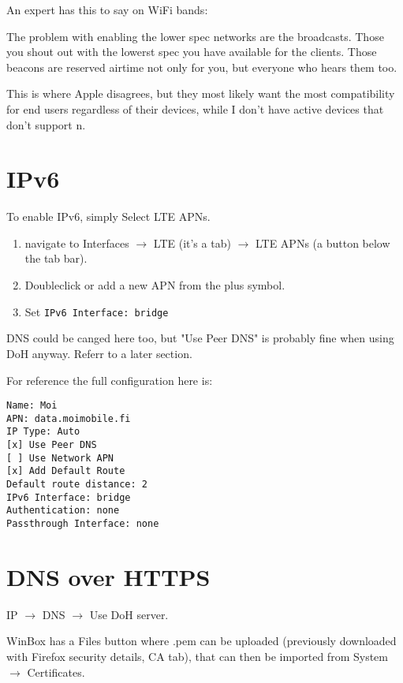 \documentclass[a4paper,colorlinks,linkcolor=blue]{rapport3}
\begin{document}
%
An expert has this to say on WiFi bands:

\begin{displayquote}
The problem with enabling the lower spec networks are the broadcasts. Those you shout out with the lowerst spec you have available for the clients.
Those beacons are reserved airtime not only for you, but everyone who hears them too.
\end{displayquote}

This is where Apple disagrees, but they most likely want the most compatibility for end users regardless of their devices, while I don't have active devices that don't support n.

\chapter{IPv6}

To enable IPv6, simply
Select LTE APNs.

\begin{enumerate}
    \item navigate to Interfaces $\rightarrow$ LTE (it's a tab) $\rightarrow$ LTE APNs (a button below the tab bar).
    \item Doubleclick or add a new APN from the plus symbol.
    \item Set \texttt{IPv6 Interface: bridge}
\end{enumerate}

DNS could be canged here too, but "Use Peer DNS" is probably fine when using DoH anyway.
Referr to a later section.

For reference the full configuration here is:

\begin{lstlisting}
Name: Moi
APN: data.moimobile.fi
IP Type: Auto
[x] Use Peer DNS
[ ] Use Network APN
[x] Add Default Route
Default route distance: 2
IPv6 Interface: bridge
Authentication: none
Passthrough Interface: none
\end{lstlisting}

\chapter{DNS over HTTPS}

IP $\rightarrow$ DNS $\rightarrow$ Use DoH server.

WinBox has a Files button where .pem can be uploaded (previously downloaded with Firefox security details, CA tab), that can then be imported from System $\rightarrow$ Certificates.
\end{document}
